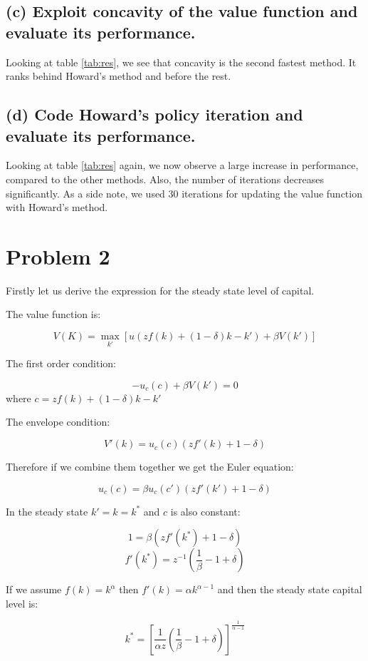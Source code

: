 \documentclass[12pt]{article}
\newcommand{\?}{\stackrel{?}{=}}
\begin{document}
\subsection*{(c) Exploit concavity of the value function and evaluate its performance.}
Looking at table \ref{tab:res}, we see that concavity is the second fastest method. It ranks behind Howard's method and before the rest.

\subsection*{(d) Code Howard's policy iteration and evaluate its performance.}
Looking at table \ref{tab:res} again, we now observe a large increase in performance, compared to the other methods. Also, the number of iterations decreases significantly. As a side note, we used 30 iterations for updating the value function with Howard's method.




\section*{Problem 2}

Firstly let us derive the expression for the steady state level of capital.

The value function is:

\[
V(K) = \max_{k'} [ u(zf(k) + (1-\delta)k - k') + \beta V(k')]
\]

The first order condition:

\[
-u_c (c) + \beta V(k') = 0
\]
where $c = zf(k) + (1-\delta)k - k'$

The envelope condition:

\[
V'(k) = u_c (c) (zf'(k) + 1-\delta)
\]

Therefore if we combine them together we get the Euler equation:

\[
u_c (c) = \beta u_c (c') (zf'(k') + 1-\delta) 
\]

In the steady state $k'=k=k^*$ and $c$ is also constant:

\[
1 = \beta (zf'(k^*) + 1 - \delta)
\]
\[
f'(k^*) = z^{-1} \left( \frac{1}{\beta} - 1 + \delta \right)
\]

If we assume $f(k) = k^\alpha$ then $f'(k) = \alpha k^{\alpha-1}$ and then the steady state capital level is:

\[
k^* = \left[ \frac{1}{\alpha z} \left( \frac{1}{\beta} - 1 + \delta \right) \right]^{\frac{1}{\alpha-1}}
\]
\end{document}
